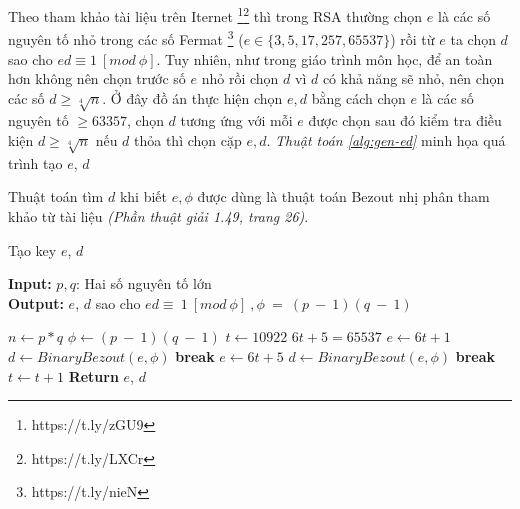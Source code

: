 Theo tham khảo tài liệu trên Iternet \footnote{https://t.ly/zGU9}\footnote{https://t.ly/LXCr} thì trong RSA thường chọn $e$ là các số nguyên tố nhỏ trong các số Fermat 
\footnote{https://t.ly/nieN} ($e \in \{3,5,17,257,65537\}$) 
rồi từ $e$ ta chọn $d$ sao cho $ed \equiv 1\ [mod\ \phi]$.
Tuy nhiên, như trong giáo trình môn học, để an toàn hơn không nên chọn trước số $e$ nhỏ rồi chọn $d$ vì $d$ có khả năng sẽ nhỏ, nên chọn các số $d \geq \sqrt[4]{n}$.
\cleardoublepage
Ở đây đồ án thực hiện chọn $e, d$ bằng cách chọn $e$ là các số nguyên tố $\geq 63357$, chọn $d$ tương ứng với mỗi $e$ được chọn sau đó kiểm tra điều kiện $d \geq \sqrt[4]{n}$ 
nếu $d$ thỏa thì chọn cặp $e, d$. \textit{Thuật toán \ref{alg:gen-ed}} minh họa quá trình tạo $e$, $d$

Thuật toán tìm $d$ khi biết $e, \phi$ được dùng là thuật toán Bezout nhị phân tham khảo từ tài liệu \cite{giaotrinh} \textit{(Phần thuật giải 1.49, trang 26)}.

\begin{algorithm}[H]
\caption{Tạo key $e$, $d$}\label{alg:gen-ed}
\hspace*{\algorithmicindent} \textbf{Input:} $p, q$: Hai số nguyên tố lớn\\
\hspace*{\algorithmicindent} \textbf{Output:} $e$, $d$ sao cho $ed \equiv \ 1\ [mod\ \phi]\ ,\phi\ =\ (p\ -\ 1)(q\ -\ 1)$ 
\begin{algorithmic}[1]
\State $n \gets p*q$
\State $\phi \gets (p\ -\ 1)(q\ -\ 1)$
\State $t \gets 10922$ \Comment $6t + 5 = 65537$
\State $e \gets 6t + 1$
\State $d \gets BinaryBezout(e, \phi)$
\State \textbf{break}
\EndIf
\EndIf
\State $e \gets 6t+5$
\State $d \gets BinaryBezout(e, \phi)$
\State \textbf{break}
\EndIf
\EndIf
\State $t \gets t + 1$
\EndWhile
\State \textbf{Return } $e$, $d$
\EndProcedure
\end{algorithmic}
\end{algorithm}